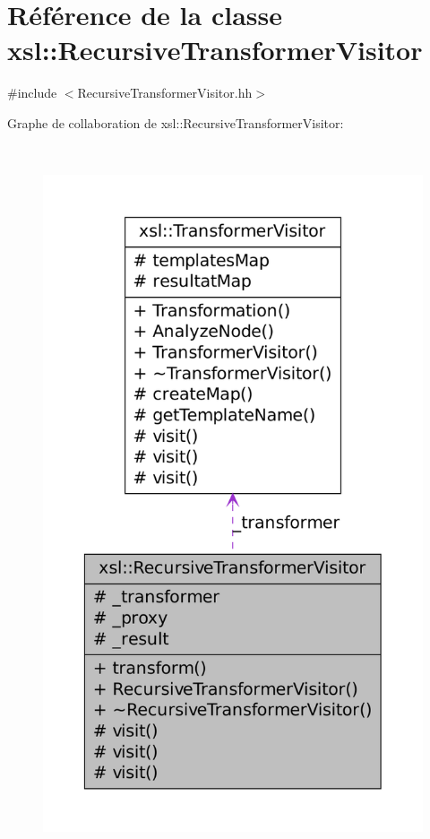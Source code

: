 \hypertarget{classxsl_1_1_recursive_transformer_visitor}{
\section{Référence de la classe xsl::RecursiveTransformerVisitor}
\label{classxsl_1_1_recursive_transformer_visitor}
}


{\ttfamily \#include $<$RecursiveTransformerVisitor.hh$>$}



Graphe de collaboration de xsl::RecursiveTransformerVisitor:
\nopagebreak
\begin{figure}[H]
\begin{center}
\leavevmode
\includegraphics[height=600pt]{classxsl_1_1_recursive_transformer_visitor__coll__graph}
\end{center}
\end{figure}
